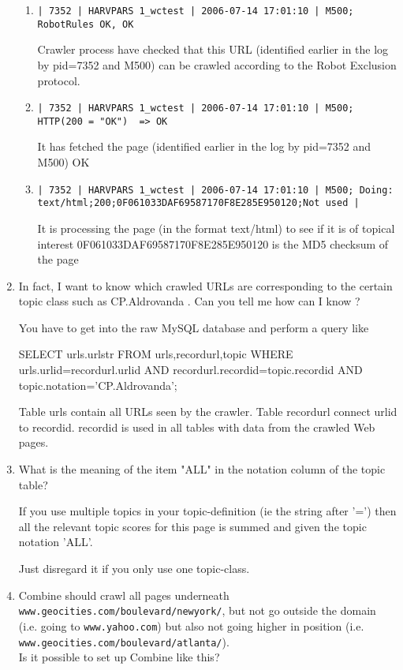 \begin{enumerate}
\begin{enumerate}
\item
\verb+| 7352 | HARVPARS 1_wctest | 2006-07-14 17:01:10 | M500; RobotRules OK, OK+

Crawler process have checked that this URL (identified earlier in the log by pid=7352 and M500) can be crawled according to the Robot Exclusion protocol.

\item
\verb+| 7352 | HARVPARS 1_wctest | 2006-07-14 17:01:10 | M500; HTTP(200 = "OK")  => OK+

It has fetched the page (identified earlier in the log by pid=7352 and M500) OK

\item
\verb+| 7352 | HARVPARS 1_wctest | 2006-07-14 17:01:10 | M500; Doing: text/html;200;0F061033DAF69587170F8E285E950120;Not used |+

It is processing the page (in the format text/html) to see if it is of topical interest
0F061033DAF69587170F8E285E950120 is the MD5 checksum of the page
\end{enumerate}

\item
In fact, I  want to  know  which  crawled  URLs  are  corresponding  to      the  certain  topic  class
such as CP.Aldrovanda . Can you tell me how can I know ?

You have to get into the raw MySQL database and perform a query like

SELECT urls.urlstr FROM urls,recordurl,topic WHERE urls.urlid=recordurl.urlid AND
recordurl.recordid=topic.recordid AND topic.notation='CP.Aldrovanda';

Table urls contain all URLs seen by the crawler.
Table recordurl connect urlid to recordid.
recordid is used in all tables with data from the crawled Web pages.

\item What is the meaning of the item "ALL"  in the notation column of the topic table?

If you use multiple topics in your topic-definition
(ie the string after '=') then all the relevant topic scores for this page is summed
and given the topic notation 'ALL'.

Just disregard it if you only use one topic-class.

\item
Combine should crawl all pages underneath \verb+www.geocities.com/boulevard/newyork/+,
but not go outside the domain (i.e. going to \verb+www.yahoo.com+) but also not
going higher in position (i.e.
\verb+www.geocities.com/boulevard/atlanta/+).\\
Is it possible to set up Combine like this?


\end{enumerate}
